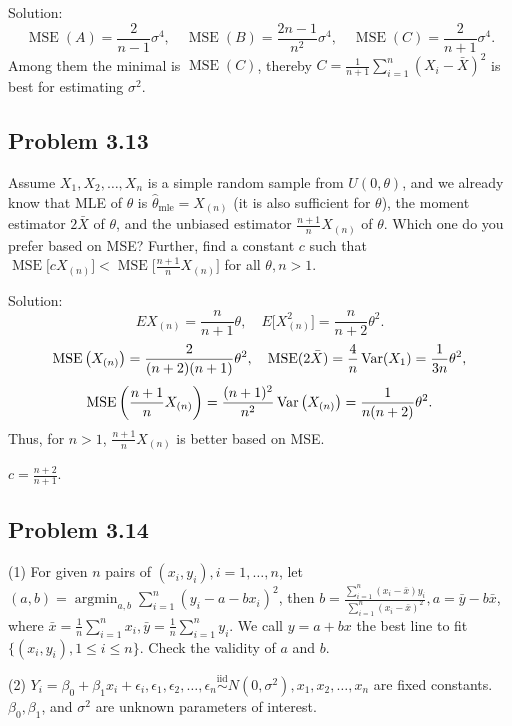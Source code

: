 {Solution:}
\[
\operatorname{MSE}(A)=\frac{2}{n-1}\sigma^{4},\quad \operatorname{MSE}(B)=\frac{2n-1}{n^{2}}\sigma^{4},\quad \operatorname{MSE}(C)=\frac{2}{n+1}\sigma^{4}.
\]
Among them the minimal is $\operatorname{MSE}(C)$, thereby $C=\frac{1}{n+1}\sum_{i=1}^{n}\left(X_{i}-\bar{X}\right)^{2}$ is best for estimating $\sigma^{2}$.

\subsection*{Problem 3.13}
Assume $X_{1},X_{2},\ldots,X_{n}$ is a simple random sample from $U(0,\theta)$, and we already know that MLE of $\theta$ is $\hat{\theta}_{\text{mle}}=X_{(n)}$ (it is also sufficient for $\theta$), the moment estimator $2\bar{X}$ of $\theta$, and the unbiased estimator $\frac{n+1}{n}X_{(n)}$ of $\theta$. Which one do you prefer based on MSE? Further, find a constant $c$ such that $\operatorname{MSE}\big[cX_{(n)}\big]<\operatorname{MSE}\big[\frac{n+1}{n}X_{(n)}\big]$ for all $\theta,n>1$.

{Solution:}
\[
EX_{(n)}=\frac{n}{n+1}\theta,\quad E\Big[X_{(n)}^{2}\Big]=\frac{n}{n+2}\theta^{2}.
\]
\[
\operatorname{MSE}\big(X_{(n)}\big)=\frac{2}{(n+2)(n+1)}\theta^{2},\quad \operatorname{MSE}(2\bar{X})=\frac{4}{n}\operatorname{Var}(X_{1})=\frac{1}{3n}\theta^{2},
\]
\[
\operatorname{MSE}\bigg(\frac{n+1}{n}X_{(n)}\bigg)=\frac{(n+1)^{2}}{n^{2}}\operatorname{Var}\big(X_{(n)}\big)=\frac{1}{n(n+2)}\theta^{2}.
\]
Thus, for $n>1$, $\frac{n+1}{n}X_{(n)}$ is better based on MSE.

$c=\frac{n+2}{n+1}$.

\subsection*{Problem 3.14}
(1) For given $n$ pairs of $(x_{i},y_{i}),i=1,\ldots,n$, let $(a,b)=\operatorname{argmin}_{a,b}\sum_{i=1}^{n}(y_{i}-a-bx_{i})^{2}$, then $b=\frac{\sum_{i=1}^{n}(x_{i}-\bar{x})y_{i}}{\sum_{i=1}^{n}(x_{i}-\bar{x})^{2}},a=\bar{y}-b\bar{x}$, where $\bar{x}=\frac{1}{n}\sum_{i=1}^{n}x_{i},\bar{y}=\frac{1}{n}\sum_{i=1}^{n}y_{i}$. We call $y=a+bx$ the best line to fit $\big\{(x_{i},y_{i}),1\leq i\leq n\big\}$. Check the validity of $a$ and $b$.

(2) $Y_{i}=\beta_{0}+\beta_{1}x_{i}+\epsilon_{i},\epsilon_{1},\epsilon_{2},\ldots,\epsilon_{n}\overset{\text{iid}}{\sim}N\left(0,\sigma^{2}\right),x_{1},x_{2},\ldots,x_{n}$ are fixed constants. $\beta_{0},\beta_{1}$, and $\sigma^{2}$ are unknown parameters of interest.

